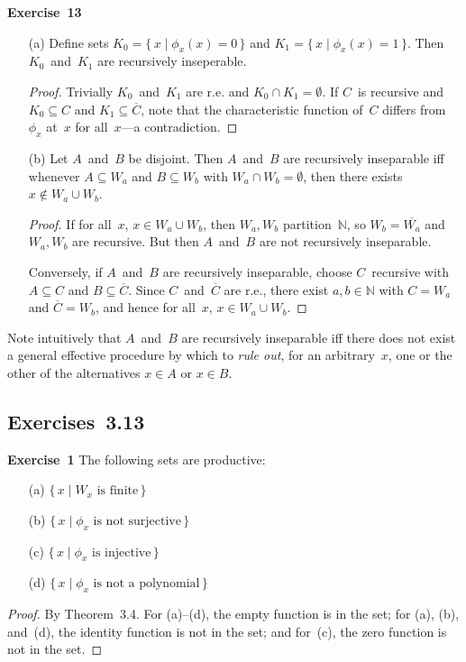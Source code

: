 \documentclass[letterpaper]{article}
\newcommand{\exercise}[2][]{\noindent\textbf{Exercise~{#2}}\ifthenelse{\isempty{#1}}{\textbf{.}}{ ({#1})\textbf{.}}}
\newcommand{\N}{\mathbb{N}}
\newcommand{\union}{\cup}
\newcommand{\sect}{\cap}
\theoremstyle{plain}
\theoremstyle{definition}
\theoremstyle{remark}
\begin{document}
\exercise{13}
\begin{enumerate}[itemsep=0pt]
\item[(a)] Define sets $K_0=\{\,x\mid\phi_x(x)=0\,\}$ and $K_1=\{\,x\mid\phi_x(x)=1\,\}$. Then $K_0$~and~$K_1$ are recursively inseperable.
\begin{proof}
Trivially $K_0$~and~$K_1$ are r.e. and $K_0\sect K_1=\emptyset$. If $C$~is recursive and $K_0\subseteq C$ and $K_1\subseteq\overline{C}$, note that the characteristic function of~$C$ differs from~$\phi_x$ at~$x$ for all~$x$---a contradiction.
\end{proof}
\item[(b)] Let $A$~and~$B$ be disjoint. Then $A$~and~$B$ are recursively inseparable iff whenever $A\subseteq W_a$ and $B\subseteq W_b$ with $W_a\sect W_b=\emptyset$, then there exists $x\not\in W_a\union W_b$.
\begin{proof}
If for all~$x$, $x\in W_a\union W_b$, then $W_a,W_b$ partition~$\N$, so $W_b=\overline{W_a}$ and $W_a,W_b$ are recursive. But then $A$~and~$B$ are not recursively inseparable.

Conversely, if $A$~and~$B$ are recursively inseparable, choose $C$~recursive with $A\subseteq C$ and $B\subseteq\overline{C}$. Since $C$~and~$\overline{C}$ are r.e., there exist $a,b\in\N$ with $C=W_a$ and $\overline{C}=W_b$, and hence for all~$x$, $x\in W_a\union W_b$.
\end{proof}
\end{enumerate}
\noindent Note intuitively that $A$~and~$B$ are recursively inseparable iff there does not exist a general effective procedure by which to \emph{rule out}, for an arbitrary~$x$, one or the other of the alternatives $x\in A$ or $x\in B$.

\subsection*{Exercises~3.13}
\exercise{1}
The following sets are productive:
\begin{enumerate}[itemsep=0pt]
\item[(a)] $\{\,x\mid W_x\text{ is finite}\,\}$
\item[(b)] $\{\,x\mid\phi_x\text{ is not surjective}\,\}$
\item[(c)] $\{\,x\mid\phi_x\text{ is injective}\,\}$
\item[(d)] $\{\,x\mid\phi_x\text{ is not a polynomial}\,\}$
\end{enumerate}
\begin{proof}
By Theorem~3.4. For (a)--(d), the empty function is in the set; for (a), (b), and~(d), the identity function is not in the set; and for~(c), the zero function is not in the set.
\end{proof}
\end{document}
